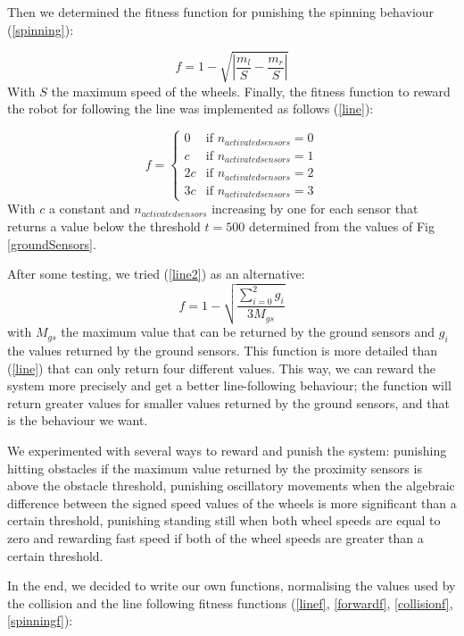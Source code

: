\documentclass[lettersize,journal]{IEEEtran}
\begin{document}
Then we determined the fitness function for punishing the spinning behaviour (\ref{spinning}):

\begin{equation}
\label{spinning}
f = 1 - \sqrt{\displaystyle\left\lvert \frac{m_l}{S}-\frac{m_r}{S} \right\rvert}
\end{equation}
With $S$ the maximum speed of the wheels.
Finally, the fitness function to reward the robot for following the line was implemented as follows (\ref{line}):

\begin{equation}
\label{line}
f = \begin{cases} 0 & \mbox{if $n_{activated sensors} = 0$} \\ c & \mbox{if $n_{activated sensors} = 1$} \\ 2c & \mbox{if $n_{activated sensors} = 2$} \\ 3c & \mbox{if $n_{activated sensors} = 3$}
        \end{cases}
\end{equation}
    With $c$ a constant and $n_{activated sensors}$ increasing by one for each sensor that returns a value below the threshold $t = 500$ determined from the values of Fig \ref{groundSensors}.
    
After some testing, we tried (\ref{line2}) as an alternative:
\begin{equation}
\label{line2}
f = 1 - \sqrt{\frac{\sum_{i=0}^{2} g_i}{3 M_{gs}}}
\end{equation}
with $M_{gs}$ the maximum value that can be returned by the ground sensors and $g_i$ the values returned by the ground sensors. This function is more detailed than (\ref{line}) that can only return four different values. This way, we can reward the system more precisely and get a better line-following behaviour; the function will return greater values for smaller values returned by the ground sensors, and that is the behaviour we want.
\par
We experimented with several ways to reward and punish the system: punishing hitting obstacles if the maximum value returned by the proximity sensors is above the obstacle threshold, punishing oscillatory movements when the algebraic difference between the signed speed values of the wheels is more significant than a certain threshold, punishing standing still when both wheel speeds are equal to zero and rewarding fast speed if both of the wheel speeds are greater than a certain threshold.
\par 
In the end, we decided to write our own functions, normalising the values used by the collision and the line following fitness functions (\ref{linef}, \ref{forwardf}, \ref{collisionf}, \ref{spinningf}):
\end{document}
